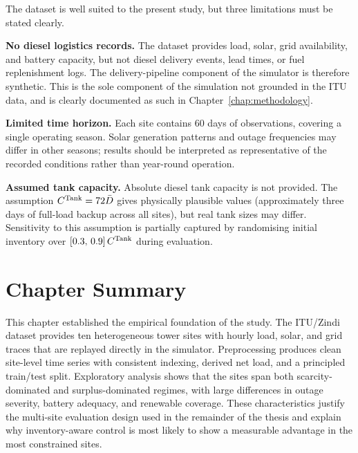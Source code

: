 The dataset is well suited to the present study, but three limitations must
be stated clearly.

\textbf{No diesel logistics records.}
The dataset provides load, solar, grid availability, and battery capacity, but
not diesel delivery events, lead times, or fuel replenishment logs.  The
delivery-pipeline component of the simulator is therefore synthetic.  This
is the sole component of the simulation not grounded in the ITU data, and
is clearly documented as such in Chapter~\ref{chap:methodology}.

\textbf{Limited time horizon.}
Each site contains 60 days of observations, covering a single operating
season.  Solar generation patterns and outage frequencies may differ in other
seasons; results should be interpreted as representative of the recorded
conditions rather than year-round operation.

\textbf{Assumed tank capacity.}
Absolute diesel tank capacity is not provided.  The assumption
$C^{\mathrm{Tank}} = 72\bar{D}$ gives physically plausible values (approximately
three days of full-load backup across all sites), but real tank sizes may
differ.  Sensitivity to this assumption is partially captured by randomising
initial inventory over $[0.3,\,0.9]\,C^{\mathrm{Tank}}$ during evaluation.


\section{Chapter Summary}
\label{sec:dataset_summary}

This chapter established the empirical foundation of the study.  The
ITU/Zindi dataset provides ten heterogeneous tower sites with hourly load,
solar, and grid traces that are replayed directly in the simulator.
Preprocessing produces clean site-level time series with consistent indexing,
derived net load, and a principled train/test split.  Exploratory analysis
shows that the sites span both scarcity-dominated and surplus-dominated
regimes, with large differences in outage severity, battery adequacy, and
renewable coverage.  These characteristics justify the multi-site evaluation
design used in the remainder of the thesis and explain why inventory-aware
control is most likely to show a measurable advantage in the most constrained
sites.